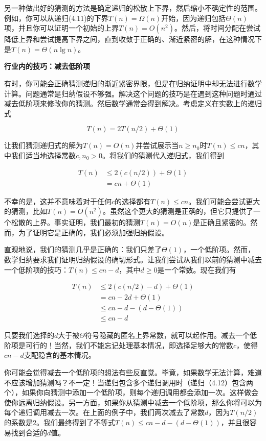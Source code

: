 \documentclass[lang=cn,newtx,10pt,scheme=chinese]{elegantbook}
\begin{document}
另一种做出好的猜测的方法是确定递归的松散上下界，然后缩小不确定性的范围。例如，你可以从递归(4.11)的下界$T(n)=\Omega(n)$开始，因为递归包括$\Theta(n)$项，并且你可以证明一个初始的上界$T(n)=O\left(n^2\right)$。然后，将时间分配在尝试降低上界和尝试提高下界之间，直到收敛于正确的、渐近紧密的解，在这种情况下是$T(n)=\Theta(n \lg n)$。

\textbf{行业内的技巧：减去低阶项}

有时，你可能会正确猜测递归的渐近紧密界限，但是在归纳证明中却无法进行数学计算。问题通常是归纳假设不够强。解决这个问题的技巧是在遇到这种问题时通过减去低阶项来修改你的猜测。然后数学通常会得到解决。考虑定义在实数上的递归式

\begin{equation}
T(n)=2 T(n / 2)+\Theta(1)
\end{equation}

让我们猜测递归式的解为$T(n)=O(n)$并尝试展示当$n \geq n_0$时$T(n) \leq c n$，其中我们适当地选择常数$c, n_0>0$。将我们的猜测代入递归式，我们得到

$$
\begin{aligned}
T(n) & \leq 2(c(n / 2))+\Theta(1) \\
& =c n+\Theta(1)
\end{aligned}
$$

不幸的是，这并不意味着对于任何$c$的选择都有$T(n) \leq c n$。我们可能会尝试更大的猜测，比如$T(n)=O\left(n^2\right)$。虽然这个更大的猜测是正确的，但它只提供了一个松散的上界。事实证明，我们最初的猜测$T(n)=O(n)$是正确且紧密的。然而，为了证明它是正确的，我们必须加强归纳假设。

直观地说，我们的猜测几乎是正确的：我们只差了$\Theta(1)$，一个低阶项。然而，数学归纳要求我们证明归纳假设的确切形式。让我们尝试从我们以前的猜测中减去一个低阶项的技巧：$T(n) \leq c n-d$，其中$d \geq 0$是一个常数。现在我们有

$$
\begin{aligned}
T(n) & \leq 2(c(n / 2)-d)+\Theta(1) \\
& =c n-2 d+\Theta(1) \\
& \leq c n-d-(d-\Theta(1)) \\
& \leq c n-d
\end{aligned}
$$

只要我们选择的$d$大于被$\Theta$符号隐藏的匿名上界常数，就可以起作用。减去一个低阶项是可行的！当然，我们不能忘记处理基本情况，即选择足够大的常数$c$，使得$c n-d$支配隐含的基本情况。

你可能会觉得减去一个低阶项的想法有些反直觉。毕竟，如果数学无法计算，难道不应该增加猜测吗？不一定！当递归包含多个递归调用时（递归（4.12）包含两个），如果你向猜测中添加一个低阶项，则每个递归调用都会添加一次。这样做会使你远离归纳假设。另一方面，如果你从猜测中减去一个低阶项，那么你将可以为每个递归调用减去一次。在上面的例子中，我们两次减去了常数$d$，因为$T(n/2)$的系数是2。我们最终得到了不等式$T(n) \leq c n-d-(d-\Theta(1))$，并且很容易找到合适的$d$值。
\end{document}
